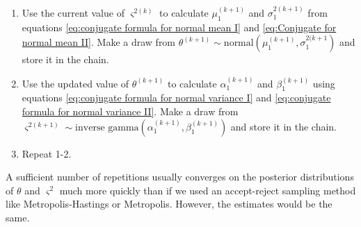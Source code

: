 \documentclass[11pt]{article}
\begin{document}
\begin{enumerate}
\item Use the current value of $\varsigma^{2(k)}$ to calculate $\mu_{1}^{(k+1)}$ and $\sigma_{1}^{2(k+1)}$ from equations \ref{eq:conjugate formula for normal mean I} and \ref{eq:Conjugate for normal mean II}. Make a draw from $\theta^{(k+1)}\sim\text{normal}\left(\mu_{1}^{(k+1)},\sigma_{1}^{2(k+1}\right)$ and store it in the chain.
\item Use the updated value of $\theta^{(k+1)}$ to calculate $\alpha_{1}^{(k+1)}$ and $\beta_{1}^{(k+1)}$ using equations \ref{eq:conjugate formula for normal variance I} and \ref{eq:conjugate formula for normal variance II}. Make a draw from $\varsigma^{2(k+1)}\sim\text{inverse gamma}\left(\alpha_{1}^{(k+1)},\beta_{1}^{(k+1)}\right)$ and store it in the chain. 
\item Repeat 1-2.
\end{enumerate}

A sufficient number of repetitions usually converges on the posterior distributions of $\theta$ and $\varsigma^{2}$ much more quickly than if we used an accept-reject sampling method like Metropolis-Hastings or Metropolis. However, the estimates would be the same.
\end{document}
